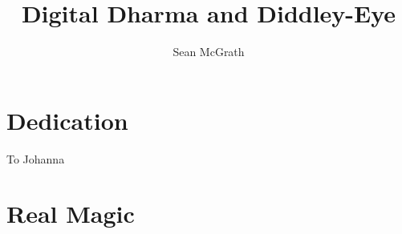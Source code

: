 \documentclass[12pt]{book}
\begin{document}
\graphicspath{ {images/} }

\title{
	{Digital Dharma and Diddley-Eye}
}
\author{Sean McGrath}

\maketitle

\chapter*{Dedication}
To Johanna

\tableofcontents

\chapter{Real Magic}

\end{document}
